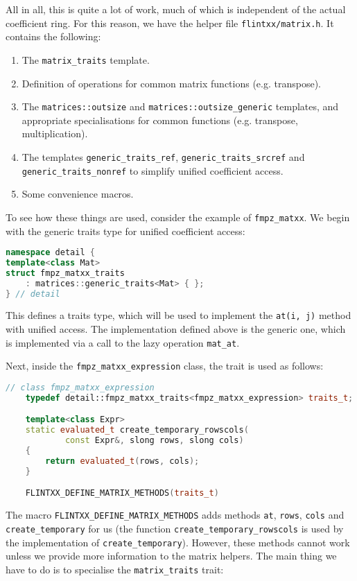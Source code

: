 \documentclass[a4paper,10pt]{book}
\newcommand{\code}{\lstinline}
\begin{document}
{{All in all, this is quite a lot of work, much of which is independent of the
actual coefficient ring. For this reason, we have the helper file
\code{flintxx/matrix.h}. It contains the following:
\begin{enumerate}
  \item The \code{matrix_traits} template.
  \item Definition of operations for common matrix functions (e.g. transpose).
  \item The \code{matrices::outsize} and \code{matrices::outsize_generic}
        templates, and appropriate specialisations for common functions
        (e.g. transpose, multiplication).
  \item The templates \code{generic_traits_ref}, \code{generic_traits_srcref}
        and \code{generic_traits_nonref} to simplify unified coefficient access.
  \item Some convenience macros.
\end{enumerate}

To see how these things are used, consider the example of \code{fmpz_matxx}.
We begin with the generic traits type for unified coefficient access:

\begin{lstlisting}[language=c++]
namespace detail {
template<class Mat>
struct fmpz_matxx_traits
    : matrices::generic_traits<Mat> { };
} // detail
\end{lstlisting}

This defines a traits type, which will be used to implement the
\code{at(i, j)} method with unified access. The implementation defined above is
the generic one, which is implemented via a call to the lazy operation
\code{mat_at}.

Next, inside the
\code{fmpz_matxx_expression} class, the trait is used as follows:

\begin{lstlisting}[language=c++]
// class fmpz_matxx_expression
    typedef detail::fmpz_matxx_traits<fmpz_matxx_expression> traits_t;

    template<class Expr>
    static evaluated_t create_temporary_rowscols(
            const Expr&, slong rows, slong cols)
    {
        return evaluated_t(rows, cols);
    }

    FLINTXX_DEFINE_MATRIX_METHODS(traits_t)
\end{lstlisting}

The macro \code{FLINTXX_DEFINE_MATRIX_METHODS} adds methods \code{at},
\code{rows}, \code{cols} and \code{create_temporary} for us (the function
\code{create_temporary_rowscols} is used by the implementation of
\code{create_temporary}). However, these
methods cannot work unless we provide more information to the matrix helpers.
The main thing we have to do is to specialise the \code{matrix_traits} trait:

}}
\end{document}
